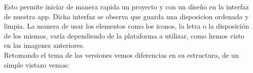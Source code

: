 \documentclass[a4paper, 11pt]{article}
\begin{document}
\begin{itemize}
            Esto permite iniciar de manera rapida un proyecto y con un diseño en la
            interfaz de nuestra app. Dicha interfaz se observa que guarda una
            disposicion ordenada y limpia. La manera de usar los elementos como los
            iconos, la letra o la disposición de los mismos, varía dependiendo de la
            plataforma a utilizar, como hemos visto en las imagenes anteriores.\\

            Retomando el tema de las versiones vemos diferencias en su estructura,
            de un simple vistazo vemos:

              \begin{figure}[H]
                \centering

\end{figure}
\end{itemize}
\end{document}
